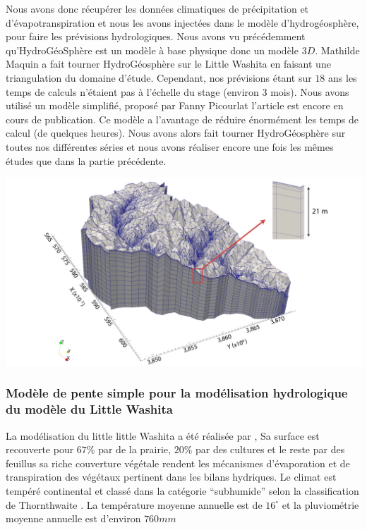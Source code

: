 \documentclass[a4paper,11pt]{article}
\begin{document}
Nous avons donc récupérer les données climatiques de précipitation et d'évapotranspiration et nous les avons injectées dans le modèle d'hydrogéosphère, pour faire les prévisions hydrologiques. Nous avons vu précédemment qu'HydroGéoSphère est un modèle à base physique donc un modèle $3D$. Mathilde Maquin a fait tourner HydroGéosphère sur le Little Washita en faisant une triangulation du domaine d'étude. Cependant, nos prévisions étant sur $18$ ans les temps de calculs n'étaient pas à l'échelle du stage (environ 3 mois). Nous avons utilisé un modèle simplifié, proposé par Fanny Picourlat l'article est encore en cours de publication. Ce modèle a l'avantage de réduire énormément les temps de calcul (de quelques heures). Nous avons alors fait tourner HydroGéosphère sur toutes nos différentes séries et nous avons réaliser encore une fois les mêmes études que dans la partie précédente.

  
\begin{center}
	\captionsetup{type=figure}
	\includegraphics[scale=0.2]{images/little_washita3D.png}
\end{center}


\subsubsection{Modèle de pente simple pour la modélisation hydrologique du modèle du Little Washita}
La  modélisation du little little Washita a été réalisée par \cite{maquin2016developpement},
Sa surface est recouverte pour $67\%$ par de la prairie, $20\%$ par des cultures et le reste par des feuillus sa riche couverture végétale rendent les mécanismes d'évaporation et de transpiration des végétaux pertinent dans les bilans hydriques. Le climat est tempéré continental \cite{rosero2011ensemble} et classé dans la catégorie ``subhumide'' selon la classification de Thornthwaite \cite{allen1991hydrology}. La température moyenne annuelle est de $16^{\circ}$ et la pluviométrie moyenne annuelle est d’environ $760 mm$ 
\end{document}
